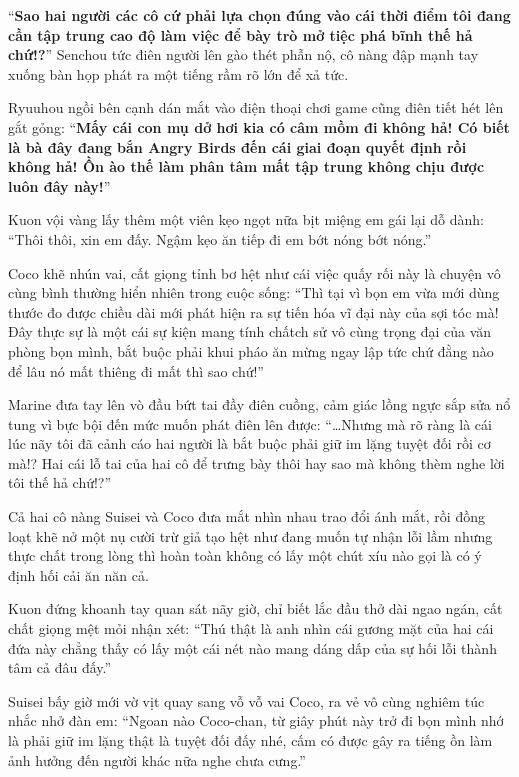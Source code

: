 \documentclass[../main.tex]{subfiles}
\begin{document}
``\textbf{Sao hai người các cô cứ phải lựa chọn đúng vào cái thời điểm tôi đang cần tập trung cao độ làm việc để bày trò mở tiệc phá bĩnh thế hả chứ!?}'' Senchou tức điên người lên gào thét phẫn nộ, cô nàng đập mạnh tay xuống bàn họp phát ra một tiếng rầm rõ lớn để xả tức.

Ryuuhou ngồi bên cạnh dán mắt vào điện thoại chơi game cũng điên tiết hét lên gắt gỏng: ``\textbf{Mấy cái con mụ dở hơi kia có câm mồm đi không hả! Có biết là bà đây đang bắn Angry Birds đến cái giai đoạn quyết định rồi không hả! Ồn ào thế làm phân tâm mất tập trung không chịu được luôn đây này!}''

Kuon vội vàng lấy thêm một viên kẹo ngọt nữa bịt miệng em gái lại dỗ dành: ``Thôi thôi, xin em đấy. Ngậm kẹo ăn tiếp đi em bớt nóng bớt nóng.''

Coco khẽ nhún vai, cất giọng tỉnh bơ hệt như cái việc quấy rối này là chuyện vô cùng bình thường hiển nhiên trong cuộc sống: ``Thì tại vì bọn em vừa mới dùng thước đo được chiều dài mới phát hiện ra sự tiến hóa vĩ đại này của sợi tóc mà! Đây thực sự là một cái sự kiện mang tính chấtch sử vô cùng trọng đại của văn phòng bọn mình, bắt buộc phải khui pháo ăn mừng ngay lập tức chứ đằng nào để lâu nó mất thiêng đi mất thì sao chứ!''

Marine đưa tay lên vò đầu bứt tai đầy điên cuồng, cảm giác lồng ngực sắp sửa nổ tung vì bực bội đến mức muốn phát điên lên được: ``\dots Nhưng mà rõ ràng là cái lúc nãy tôi đã cảnh cáo hai người là bắt buộc phải giữ im lặng tuyệt đối rồi cơ mà!? Hai cái lỗ tai của hai cô để trưng bày thôi hay sao mà không thèm nghe lời tôi thế hả chứ!?''

Cả hai cô nàng Suisei và Coco đưa mắt nhìn nhau trao đổi ánh mắt, rồi đồng loạt khẽ nở một nụ cười trừ giả tạo hệt như đang muốn tự nhận lỗi lầm nhưng thực chất trong lòng thì hoàn toàn không có lấy một chút xíu nào gọi là có ý định hối cải ăn năn cả.

Kuon đứng khoanh tay quan sát nãy giờ, chỉ biết lắc đầu thở dài ngao ngán, cất chất giọng mệt mỏi nhận xét: ``Thú thật là anh nhìn cái gương mặt của hai cái đứa này chẳng thấy có lấy một cái nét nào mang dáng dấp của sự hối lỗi thành tâm cả đâu đấy.''

Suisei bấy giờ mới vờ vịt quay sang vỗ vỗ vai Coco, ra vẻ vô cùng nghiêm túc nhắc nhở đàn em: ``Ngoan nào Coco-chan, từ giây phút này trở đi bọn mình nhớ là phải giữ im lặng thật là tuyệt đối đấy nhé, cấm có được gây ra tiếng ồn làm ảnh hưởng đến người khác nữa nghe chưa cưng.''
\end{document}
